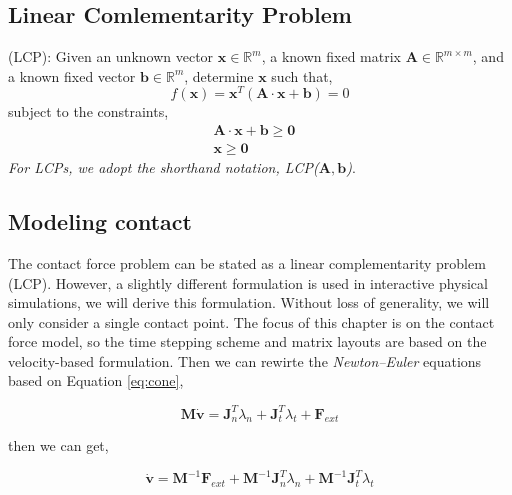 \subsection{Linear Comlementarity Problem}
    (LCP): Given an unknown vector $\mathbf{x} \in \mathbb{R}^{m}$, a known fixed matrix $\pmb{A} \in \mathbb{R}^{m\times m}$, and a known fixed vector $\pmb{b} \in \mathbb{R}^{m}$, determine $\mathbf{x}$ such that,
    \begin{equation}
        f(\mathbf{x}) = \mathbf{x}^{T}(\pmb{A}\cdot\mathbf{x} + \pmb{b}) = 0
    \end{equation}
    subject to the constraints,
    \begin{subequations}
    \begin{align}
        \pmb{A}\cdot\mathbf{x} + \pmb{b} \ge \pmb{0} & \\
        \mathbf{x} \ge \pmb{0} &
    \end{align}
    \end{subequations}
    \textit{For LCPs, we adopt the shorthand notation, LCP($\pmb{A}, \pmb{b}$)}.


\subsection{Modeling contact}
    The contact force problem can be stated as a linear complementarity problem (LCP)\cite{bender2014interactive}. However, a slightly different formulation is used in interactive physical simulations, we will derive this formulation. Without loss of generality, we will only consider a single contact point. The focus of this chapter is on the contact force model, so the time stepping scheme and matrix layouts are based on the velocity-based formulation. Then we can rewirte the \textit{Newton–Euler} equations based on Equation \ref{eq:cone},

    \begin{equation}
        \pmb{M}\dot{\mathbf{v}} = \pmb{J}_{n}^{T}\lambda_n + \pmb{J}_{t}^{T}\lambda_{t} + \mathbf{F}_{ext}
    \end{equation}

    then we can get,

    \begin{equation}
        \dot{\mathbf{v}} = \pmb{M}^{-1}\mathbf{F}_{ext} + \pmb{M}^{-1}\pmb{J}_{n}^{T}\lambda_{n} + \pmb{M}^{-1}\pmb{J}_{t}^{T}\lambda_{t}
        \label{sys}
    \end{equation}

